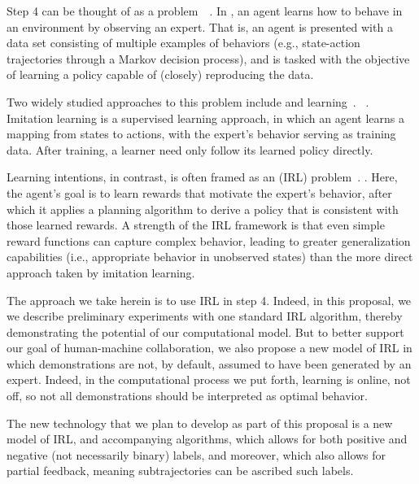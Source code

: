 Step 4 can be thought of as a 
problem~\cite{?}~.
In , an agent learns how to behave
in an environment by observing an expert.  That is, an agent is
presented with a data set consisting of multiple examples of behaviors
(e.g., state-action trajectories through a Markov decision process),
and is tasked with the objective of learning a policy capable of
(closely) reproducing the data.

Two widely studied approaches to this problem include
 and  learning~\cite{???}.
~.
Imitation learning is a supervised learning approach, in which
an agent learns a mapping from states to actions,
with the expert's behavior serving as training data.
After training, a learner need only follow its learned policy directly.

Learning intentions, in contrast, is often framed as an 
 (IRL) problem~\cite{IRL???}.
.
Here, the agent's goal is to learn rewards that motivate the expert's
behavior, after which it applies a planning algorithm to derive a
policy that is consistent with those learned rewards.
A strength of the IRL framework is that even simple reward functions
can capture complex behavior, leading to greater generalization
capabilities (i.e., appropriate behavior in unobserved states) than
the more direct approach taken by imitation learning.

The approach we take herein is to use IRL in step 4.  Indeed, in this
proposal, we we describe preliminary experiments with one standard IRL
algorithm, thereby demonstrating the potential of our computational model.
%
But to better support our goal of human-machine collaboration, we also
propose a new model of IRL in which demonstrations are not, by
default, assumed to have been generated by an expert.  Indeed, in the
computational process we put forth, learning is online, not off, so
not all demonstrations should be interpreted as optimal behavior.

The new technology that we plan to develop as part of this proposal is
a new model of IRL, and accompanying algorithms, which allows for both
positive and negative (not necessarily binary) labels, and moreover,
which also allows for partial feedback, meaning subtrajectories can be
ascribed such labels.

